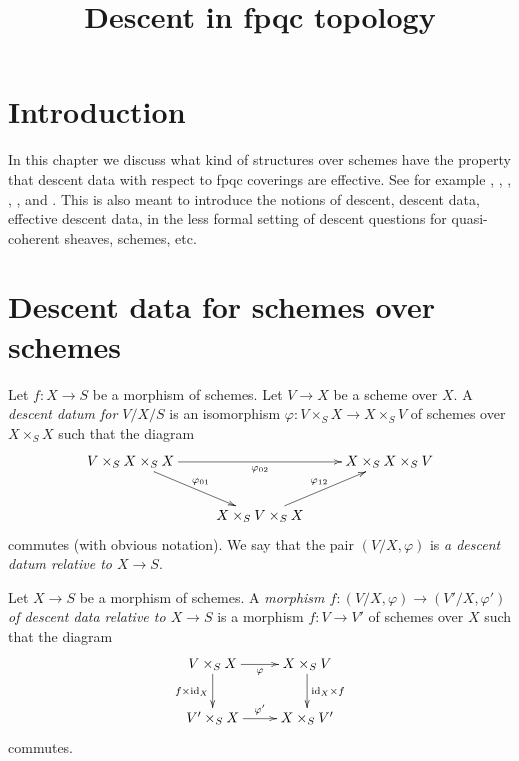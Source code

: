 

%


\title{Descent in fpqc topology}

\maketitle

\tableofcontents

\section{Introduction}
\label{section-introduction}

\noindent
In this chapter we discuss what kind of structures over schemes
have the property that descent data with respect to fpqc coverings
are effective. See for example \cite{Gr-I}, \cite{Gr-II}, \cite{Gr-III},
\cite{Gr-IV}, \cite{Gr-V}, and \cite{Gr-VI}.
This is also meant to introduce the notions of
descent, descent data, effective descent data, in the less formal
setting of descent questions for quasi-coherent sheaves, schemes, etc.


\section{Descent data for schemes over schemes}
\label{section-descent-datum}

\begin{definition}
\label{definition-descent-datum}
Let $f : X \to S$ be a morphism of schemes.
Let $V \to X$ be a scheme over $X$.
A {\it descent datum for $V/X/S$} is an isomorphism
$\varphi : V \times_S X \to X \times_S V$ of schemes over
$X \times_S X$ such that the diagram
$$
\xymatrix{
V \times_S X \times_S X \ar[rd]^{\varphi_{01}} \ar[rr]_{\varphi_{02}} &
&
X \times_S X \times_S V\\
&
X \times_S V \times_S X \ar[ru]^{\varphi_{12}}
}
$$
commutes (with obvious notation).
We say that the pair $(V/X, \varphi)$ is
{\it a descent datum relative to $X \to S$}.
\end{definition}

\begin{definition}
\label{definition-morphism-descent-data}
Let $X \to S$ be a morphism of schemes.
A {\it morphism $f : (V/X, \varphi) \to (V'/X, \varphi')$ of
descent data relative to $X \to S$} is a morphism
$f : V \to V'$ of schemes over $X$ such that 
the diagram
$$
\xymatrix{
V \times_S X \ar[r]_{\varphi} \ar[d]_{f \times \text{id}_X} &
X \times_S V \ar[d]^{\text{id}_X \times f} \\
V' \times_S X \ar[r]^{\varphi'} & X \times_S V'
}
$$
commutes.
\end{definition}

